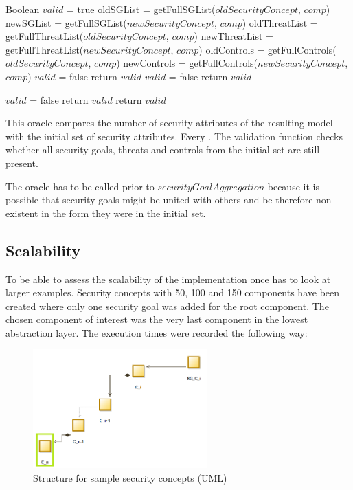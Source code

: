 \begin{algorithm}[H]
\begin{algorithmic}
\State Boolean $valid$ = true
\State oldSGList = getFullSGList($oldSecurityConcept$, $comp$)
\State newSGList = getFullSGList($newSecurityConcept$, $comp$)
\State oldThreatList = getFullThreatList($oldSecurityConcept$, $comp$)
\State newThreatList = getFullThreatList($newSecurityConcept$, $comp$)
\State oldControls = getFullControls($oldSecurityConcept$, $comp$)
\State newControls = getFullControls($newSecurityConcept$, $comp$)
\State $valid$ = false
\State return $valid$
\EndIf
\EndFor
{}
\State $valid$ = false
\State return $valid$
\EndIf
\EndFor

\State $valid$ = false
\State return $valid$
\EndIf
\EndFor
\EndFor
\State return $valid$
\EndFunction
\end{algorithmic}
\end{algorithm}

This oracle compares the number of security attributes of the resulting model with the initial set of security attributes. Every . The validation function checks whether all security goals, threats and controls from the initial set are still present. 

The oracle has to be called prior to $securityGoalAggregation$ because it is possible that security goals might be united with others and be therefore non-existent in the form they were in the initial set. 

\subsection{Scalability}

To be able to assess the scalability of the implementation once has to look at larger examples. Security concepts with 50, 100 and 150 components have been created where only one security goal was added for the root component. The chosen component of interest was the very last component in the lowest abstraction layer. The execution times were recorded the following way:

\begin{figure}[H]
\centering
\includegraphics[width=0.6\textwidth]{pictures/examples}
\caption{Structure for sample security concepts (UML)}
\end{figure}

